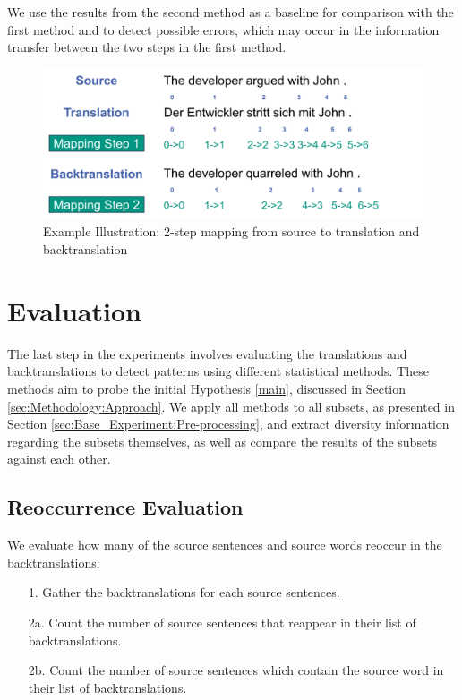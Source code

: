 We use the results from the second method as a baseline for comparison with the first method and to detect possible errors, which may occur in the information transfer between the two steps in the first method.

\begin{figure}[!htb]
  \centering
  \includegraphics[scale=0.5]{figures/alignment.png}
  \caption{Example Illustration: 2-step mapping from source to translation and backtranslation}
  \label{fig:alignment}
\end{figure}

\section{Evaluation}
\label{sec:Base_Experiment:Evaluation}

The last step in the experiments involves evaluating the translations and backtranslations to detect patterns using different statistical methods. These methods aim to probe the initial Hypothesis \ref{main}, discussed in Section \ref{sec:Methodology:Approach}. We apply all methods to all subsets, as presented in Section \ref{sec:Base_Experiment:Pre-processing}, and extract diversity information regarding the subsets themselves, as well as compare the results of the subsets against each other.


\subsection{Reoccurrence Evaluation}
\label{sec:Base_Experiment:Statistics:Reoccurrence}
We evaluate how many of the source sentences and source words reoccur in the backtranslations:

\begin{enumerate}
    \item[1. ] Gather the backtranslations for each source sentences.
    \item[2a. ] Count the number of source sentences that reappear in their list of backtranslations.
    \item[2b. ] Count the number of source sentences which contain the source word in their list of backtranslations.
\end{enumerate}


